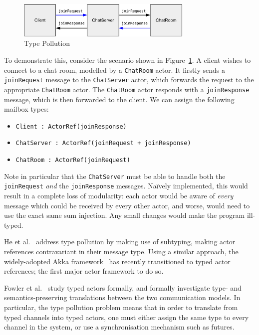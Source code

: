 \documentclass[
graybox,
envcountchap
]{svmult}
\begin{document}
\begin{bibunit}
  \begin{figure}[t]
    \centering
    \includegraphics[width=0.75\textwidth]{img/type-pollution-example.pdf}
    \caption{Type Pollution}
    \label{fig:bt:type-pollution}
  \end{figure}

  To demonstrate this,
  consider the scenario shown in Figure~\ref{fig:bt:type-pollution}. A client
  wishes to connect to a chat room, modelled by a \lstinline+ChatRoom+ actor. It
  firstly sends a \lstinline+joinRequest+ message to the \lstinline+ChatServer+
  actor, which forwards the request to the appropriate \lstinline+ChatRoom+
  actor. The \lstinline+ChatRoom+ actor responds with a \lstinline+joinResponse+
  message, which is then forwarded to the client. We can assign the following
  mailbox types:


  \begin{itemize}
    \item \lstinline|Client : ActorRef(joinResponse)|
    \item \lstinline|ChatServer : ActorRef(joinRequest + joinResponse)|
    \item \lstinline|ChatRoom : ActorRef(joinRequest)|
  \end{itemize}

  Note in particular that the \lstinline+ChatServer+ must be able to handle both
  the \lstinline+joinRequest+ \emph{and} the \lstinline+joinResponse+ messages.
  Na\"ively implemented, this would result in a complete loss of modularity:
  each actor would be aware of \emph{every} message which could be received by
  every other actor, and worse, would need to use the exact same sum injection.
  Any small changes would make the program ill-typed.

  He et al.~\cite{HeWT14:actors} address type pollution by making use of subtyping, making
  actor references contravariant in their message type. Using a similar
  approach, the widely-adopted Akka framework~\cite{akka} has recently
  transitioned to typed actor references; the first major actor framework to do so.

  Fowler et al.~\cite{FowlerLW17:mm} study typed actors formally, and formally investigate
  type- and semantics-preserving translations between the two communication
  models. In particular, the type pollution problem means that in order to
  translate from typed channels into typed actors, one must either assign the
  same type to every channel in the system, or use a synchronisation mechanism
  such as futures.


\end{bibunit}
\end{document}
